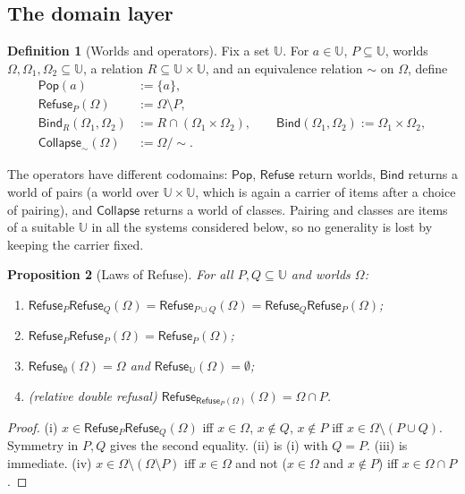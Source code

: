 \documentclass[11pt]{article}
\newcommand{\Pop}{\mathsf{Pop}}
\newcommand{\Refuse}{\mathsf{Refuse}}
\newcommand{\Bind}{\mathsf{Bind}}
\newcommand{\Coll}{\mathsf{Collapse}}
\newcommand{\U}{\mathbb{U}}
\newcommand{\Om}{\Omega}
\theoremstyle{definition}
\newtheorem{definition}{Definition}[section]
\theoremstyle{plain}
\newtheorem{proposition}[definition]{Proposition}
\theoremstyle{remark}
\begin{document}
\subsection{The domain layer}

\begin{definition}[Worlds and operators]\label{def:ops}
Fix a set $\U$. For $a\in\U$, $P\subseteq\U$, worlds $\Om,\Om_1,\Om_2\subseteq\U$, a relation $R\subseteq\U\times\U$, and an equivalence relation $\sim$ on $\Om$, define
\begin{align*}
\Pop(a) &:= \{a\},\\
\Refuse_P(\Om) &:= \Om\setminus P,\\
\Bind_R(\Om_1,\Om_2) &:= R\cap(\Om_1\times\Om_2),\qquad \Bind(\Om_1,\Om_2):=\Om_1\times\Om_2,\\
\Coll_{\sim}(\Om) &:= \Om/{\sim}.
\end{align*}
\end{definition}

The operators have different codomains: $\Pop$, $\Refuse$ return worlds, $\Bind$ returns a world of pairs (a world over $\U\times\U$, which is again a carrier of items after a choice of pairing), and $\Coll$ returns a world of classes. Pairing and classes are items of a suitable $\U$ in all the systems considered below, so no generality is lost by keeping the carrier fixed.

\begin{proposition}[Laws of Refuse]\label{prop:refuse-laws}
For all $P,Q\subseteq\U$ and worlds $\Om$:
\begin{enumerate}[label=(\roman*)]
\item $\Refuse_P\Refuse_Q(\Om)=\Refuse_{P\cup Q}(\Om)=\Refuse_Q\Refuse_P(\Om)$;
\item $\Refuse_P\Refuse_P(\Om)=\Refuse_P(\Om)$;
\item $\Refuse_\emptyset(\Om)=\Om$ and $\Refuse_{\U}(\Om)=\emptyset$;
\item (relative double refusal) $\Refuse_{\Refuse_P(\Om)}(\Om)=\Om\cap P$.
\end{enumerate}
\end{proposition}
\begin{proof}
(i) $x\in\Refuse_P\Refuse_Q(\Om)$ iff $x\in\Om$, $x\notin Q$, $x\notin P$ iff $x\in\Om\setminus(P\cup Q)$. Symmetry in $P,Q$ gives the second equality. (ii) is (i) with $Q=P$. (iii) is immediate. (iv) $x\in\Om\setminus(\Om\setminus P)$ iff $x\in\Om$ and not ($x\in\Om$ and $x\notin P$) iff $x\in\Om\cap P$.
\end{proof}
\end{document}
